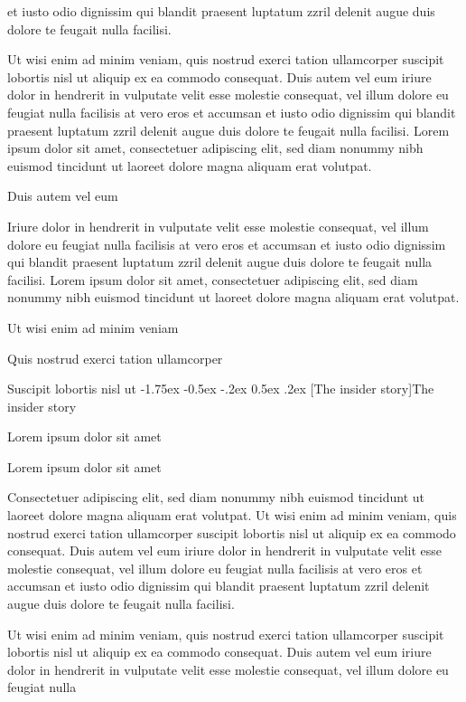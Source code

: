 \documentclass[11pt]{article}\makeatletter
\makeatletter
\renewcommand\section{\@startsection {section}{1}{\z@}%
     {-1.75ex \@plus -0.5ex \@minus -.2ex}%
     {0.5ex \@plus .2ex}%
     {\reset@font\Large\bfseries\sffamily}}
\renewcommand\subsection{\@startsection{subsection}{2}{\z@}%
     {-1.75ex\@plus -0.5ex \@minus- .2ex}%
     {0.5ex \@plus .2ex}%
     {\reset@font\Large\sffamily}}
\def\DivII{\subsection}
\def\DivII{\section}
\makeatother
\begin{document}
      et iusto odio dignissim qui blandit praesent luptatum zzril delenit
      augue duis dolore te feugait nulla facilisi.\par Ut wisi enim ad minim veniam, quis nostrud exerci tation
      ullamcorper suscipit lobortis nisl ut aliquip ex ea commodo
      consequat. Duis autem vel eum iriure dolor in hendrerit in vulputate
      velit esse molestie consequat, vel illum dolore eu feugiat nulla
      facilisis at vero eros et accumsan et iusto odio dignissim qui blandit
      praesent luptatum zzril delenit augue duis dolore te feugait nulla
      facilisi. Lorem ipsum dolor sit amet, consectetuer adipiscing elit,
      sed diam nonummy nibh euismod tincidunt ut laoreet dolore magna
      aliquam erat volutpat. \par Duis autem vel eum \par Iriure dolor in hendrerit in vulputate velit esse molestie
      consequat, vel illum dolore eu feugiat nulla facilisis at vero eros et
      accumsan et iusto odio dignissim qui blandit praesent luptatum zzril
      delenit augue duis dolore te feugait nulla facilisi. Lorem ipsum dolor
      sit amet, consectetuer adipiscing elit, sed diam nonummy nibh euismod
      tincidunt ut laoreet dolore magna aliquam erat volutpat. \par Ut wisi enim ad minim veniam\par Quis nostrud exerci tation ullamcorper \par Suscipit lobortis nisl ut 
\DivII[The insider story]{The insider story}\label{part2.1}\par Lorem ipsum dolor sit amet\par Lorem ipsum dolor sit amet\par Consectetuer adipiscing elit, sed diam nonummy nibh euismod
      tincidunt ut laoreet dolore magna aliquam erat volutpat. Ut wisi enim
      ad minim veniam, quis nostrud exerci tation ullamcorper suscipit
      lobortis nisl ut aliquip ex ea commodo consequat. Duis autem vel eum
      iriure dolor in hendrerit in vulputate velit esse molestie consequat,
      vel illum dolore eu feugiat nulla facilisis at vero eros et accumsan
      et iusto odio dignissim qui blandit praesent luptatum zzril delenit
      augue duis dolore te feugait nulla facilisi.\par Ut wisi enim ad minim veniam, quis nostrud exerci tation
      ullamcorper suscipit lobortis nisl ut aliquip ex ea commodo
      consequat. Duis autem vel eum iriure dolor in hendrerit in vulputate
      velit esse molestie consequat, vel illum dolore eu feugiat nulla
\end{document}
